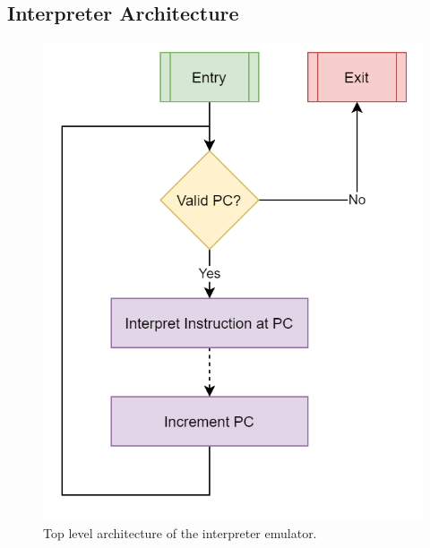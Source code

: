 \subsection{Interpreter Architecture}

\begin{figure}[h]
    \centering
    \includegraphics[width=0.5\linewidth]{diagrams/interpreter.png}
    \caption{Top level architecture of the interpreter emulator.}
    \label{figure:interpreter-arch}
\end{figure}